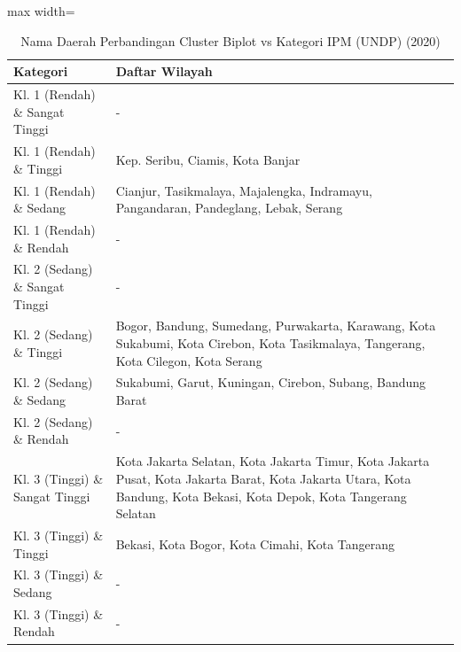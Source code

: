 \begin{table}[H]
\centering
\caption{Nama Daerah Perbandingan Cluster Biplot vs Kategori IPM (UNDP) (2020)} \label{tab:appcrossname2020}
\begin{adjustbox}{max width=\textwidth}
\begin{tabular}{|p{4cm}|p{10cm}|}
\hline
\textbf{Kategori} & \textbf{Daftar Wilayah} \\
\hline
Kl. 1 (Rendah) \& Sangat Tinggi & - \\
\hline
Kl. 1 (Rendah) \& Tinggi & Kep. Seribu, Ciamis, Kota Banjar \\
\hline
Kl. 1 (Rendah) \& Sedang & Cianjur, Tasikmalaya, Majalengka, Indramayu, Pangandaran, Pandeglang, Lebak, Serang \\
\hline
Kl. 1 (Rendah) \& Rendah & - \\
\hline
Kl. 2 (Sedang) \& Sangat Tinggi & - \\
\hline
Kl. 2 (Sedang) \& Tinggi & Bogor, Bandung, Sumedang, Purwakarta, Karawang, Kota Sukabumi, Kota Cirebon, Kota Tasikmalaya, Tangerang, Kota Cilegon, Kota Serang \\
\hline
Kl. 2 (Sedang) \& Sedang & Sukabumi, Garut, Kuningan, Cirebon, Subang, Bandung Barat \\
\hline
Kl. 2 (Sedang) \& Rendah & - \\
\hline
Kl. 3 (Tinggi) \& Sangat Tinggi & Kota Jakarta Selatan, Kota Jakarta Timur, Kota Jakarta Pusat, Kota Jakarta Barat, Kota Jakarta Utara, Kota Bandung, Kota Bekasi, Kota Depok, Kota Tangerang Selatan \\
\hline
Kl. 3 (Tinggi) \& Tinggi & Bekasi, Kota Bogor, Kota Cimahi, Kota Tangerang \\
\hline
Kl. 3 (Tinggi) \& Sedang & - \\
\hline
Kl. 3 (Tinggi) \& Rendah & - \\
\hline
\end{tabular}
\end{adjustbox}
\end{table}